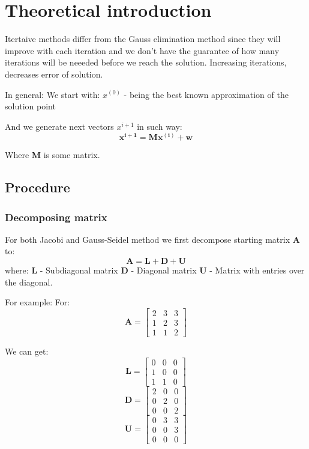 \section{Theoretical introduction}

Itertaive methods differ from the Gauss elimination method since they will improve with each iteration and we don't have the guarantee of how many iterations will be neeeded before we reach the solution. Increasing iterations, decreases error of solution.

In general:
We start with:
 \textbf{$x^{(0)}$ } - being the best known approximation of the solution point

And we generate next vectors  \textbf{$x^{i+1}$}  in such way:
\[ \mathbf{x^{i+1}} = \mathbf{M}\mathbf{x^{(i)}} + \mathbf{w} \]

Where $\mathbf{M}$ is some matrix.

\subsection{Procedure}

\subsubsection{Decomposing matrix}
For both Jacobi and Gauss-Seidel method we first decompose starting matrix $ \mathbf{A} $ to:
\[ \mathbf{A} = \mathbf{L} + \mathbf{D} + \mathbf{U} \]
where:
$ \mathbf{L} $ - Subdiagonal matrix
$ \mathbf{D} $ - Diagonal matrix
$ \mathbf{U} $ - Matrix with entries over the diagonal.

For example:
For:
\[ \mathbf{A} = \begin{bmatrix}
2 & 3 & 3\\
1 & 2 & 3\\
1 & 1 & 2
\end{bmatrix}
\]

We can get:
\[ \mathbf{L} = \begin{bmatrix}
0 & 0 & 0\\
1 & 0 & 0\\
1 & 1 & 0
\end{bmatrix}
\]
\[ \mathbf{D} = \begin{bmatrix}
2 & 0 & 0\\
0 & 2 & 0\\
0 & 0 & 2
\end{bmatrix}
\]
\[ \mathbf{U} = \begin{bmatrix}
0 & 3 & 3\\
0 & 0 & 3\\
0 & 0 & 0
\end{bmatrix}
\]

